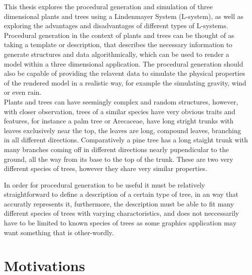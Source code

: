 \begin{flushleft}

This thesis explores the procedural generation and simulation of three dimensional plants and trees using a Lindenmayer System (L-system), as well as exploring the advantages and disadvantages of different types of L-systems. Procedural generation in the context of plants and trees can be thought of as taking a template or description, that describes the necessary information to generate structures and data algorithmically, which can be used to render a model within a three dimensional application. The procedural generation should also be capable of providing the relavent data to simulate the physical properties of the rendered model in a realistic way, for example the simulating gravity, wind or even rain. \\

Plants and trees can have seemingly complex and random structures, however, with closer observation, trees of a similar species have very obvious traits and features, for instance a palm tree or Arecaceae, have long stright trunks with leaves exclusively near the top, the leaves are long, compound leaves, branching in all different directions. Comparatively a pine tree has a long staight trunk with many branches coming off in different directions nearly pupendicular to the ground, all the way from its base to the top of the trunk. These are two very different species of trees, however they share very similar properties. 

In order for procedural generation to be useful it must be relatively straightforward to define a description of a certain type of tree, in an way that accuratly represents it, furthermore, the description must be able to fit many different species of trees with varying charactoristics, and does not neccessarily have to be limited to known species of trees as some graphics application may want something that is other-wordly.




\end{flushleft}

\section{Motivations}
 
